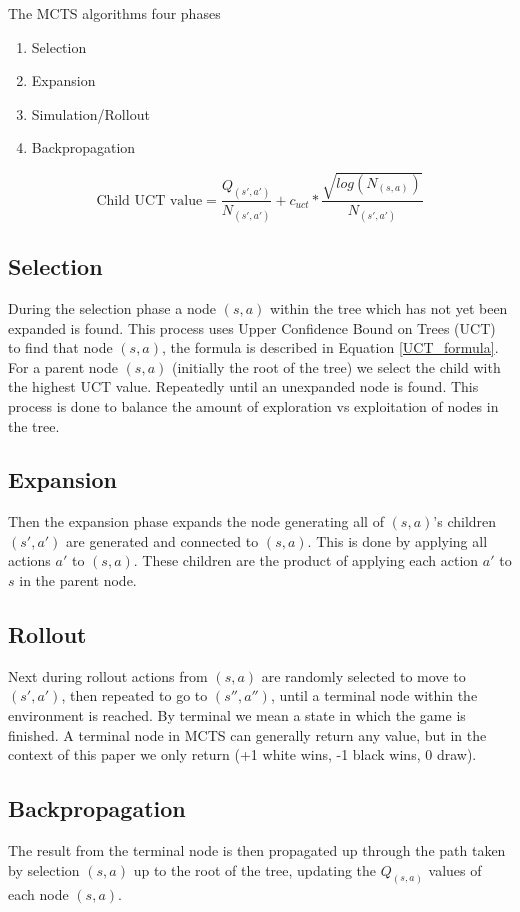 The MCTS algorithms four phases
\begin{enumerate}
  \item Selection
  \item Expansion
  \item Simulation/Rollout
  \item Backpropagation
\end{enumerate}


\begin{equation} \label{UCT_formula}
  \text{Child UCT value} = \frac{Q_{(s',a')}}{N_{(s',a')}} + c_{uct} * \frac{\sqrt{log(N_{(s,a)})}}{N_{(s',a')}}
\end{equation}

\subsection*{Selection}
During the selection phase a node $(s,a)$ within the tree which has not yet been expanded is found.
This process uses Upper Confidence Bound on Trees (UCT) to find that node $(s,a)$, the formula is described in Equation \ref{UCT_formula}. For a parent node $(s,a)$
(initially the root of the tree) we select the child with the highest UCT value. Repeatedly until an unexpanded
node is found. This process is done to balance the amount of exploration vs exploitation of nodes in the
tree.

\subsection*{Expansion}
Then the expansion phase expands the node generating all of $(s,a)$'s children $(s',a')$ are generated
and connected to $(s,a)$. This is done by applying all actions $a'$ to $(s,a)$. These children are the
product of applying each action $a'$ to $s$ in the parent node.

\subsection*{Rollout}
Next during rollout actions from $(s,a)$ are randomly selected to move to $(s',a')$, then repeated
to go to $(s'',a'')$, until a terminal node within the environment is reached. By terminal we mean a
state in which the game is finished. A terminal node in MCTS can generally return any value, but in the
context of this paper we only return (+1 white wins, -1 black wins, 0 draw).


\subsection*{Backpropagation}
The result from the terminal node is then propagated up through the path taken by selection $(s,a)$ up
to the root of the tree, updating the $Q_{(s,a)}$ values of each node $(s,a)$.

